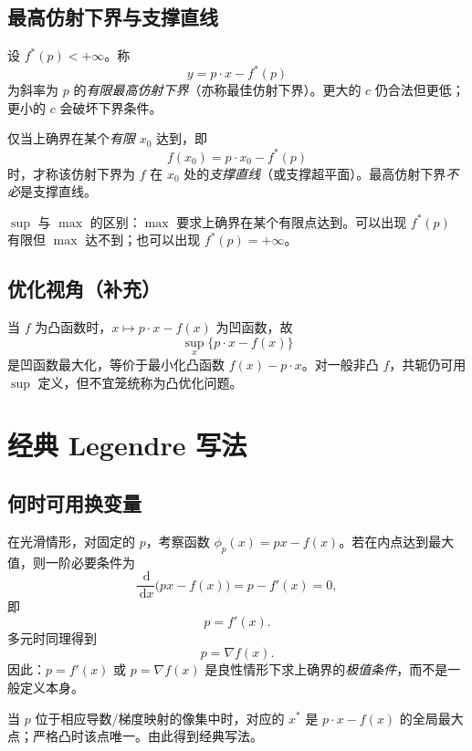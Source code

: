 \documentclass[
    lang=cn,
    color=blue,
    mode=fancy,
    thmcnt=section,
    scheme=chinese,
    chinesefont=ctexfont
]{elegantbook}
\newcommand{\dd}{\,\mathrm{d}}
\newcommand{\fstarp}{f^{\ast}(p)}
\begin{document}
\section{最高仿射下界与支撑直线}

\begin{definition}[最高仿射下界与支撑直线]
设 $\fstarp<+\infty$。称
\[
y=p\cdot x-\fstarp
\]
为斜率为 $p$ 的\emph{有限最高仿射下界}（亦称最佳仿射下界）。更大的 $c$ 仍合法但更低；更小的 $c$ 会破坏下界条件。

仅当上确界在某个\emph{有限} $x_{0}$ 达到，即
\[
f(x_{0})=p\cdot x_{0}-\fstarp
\]
时，才称该仿射下界为 $f$ 在 $x_{0}$ 处的\emph{支撑直线}（或支撑超平面）。最高仿射下界\emph{不必}是支撑直线。
\end{definition}

\begin{remark}
$\sup$ 与 $\max$ 的区别：$\max$ 要求上确界在某个有限点达到。可以出现 $\fstarp$ 有限但 $\max$ 达不到；也可以出现 $\fstarp=+\infty$。
\end{remark}


\section{优化视角（补充）}

当 $f$ 为凸函数时，$x\mapsto p\cdot x-f(x)$ 为凹函数，故
\[
\sup_{x}\bigl\{p\cdot x-f(x)\bigr\}
\]
是凹函数最大化，等价于最小化凸函数 $f(x)-p\cdot x$。对一般非凸 $f$，共轭仍可用 $\sup$ 定义，但不宜笼统称为凸优化问题。


\chapter{经典 Legendre 写法}

\section{何时可用换变量}

在光滑情形，对固定的 $p$，考察函数 $\phi_{p}(x)=px-f(x)$。若在内点达到最大值，则一阶必要条件为
\[
\frac{\dd}{\dd x}\bigl(px-f(x)\bigr)=p-f'(x)=0,
\]
即
\[
p=f'(x).
\]
多元时同理得到
\[
p=\nabla f(x).
\]
因此：$p=f'(x)$ 或 $p=\nabla f(x)$ 是良性情形下求上确界的\emph{极值条件}，而不是一般定义本身。

当 $p$ 位于相应导数/梯度映射的像集中时，对应的 $x^{\ast}$ 是 $p\cdot x-f(x)$ 的全局最大点；严格凸时该点唯一。由此得到经典写法。
\end{document}
